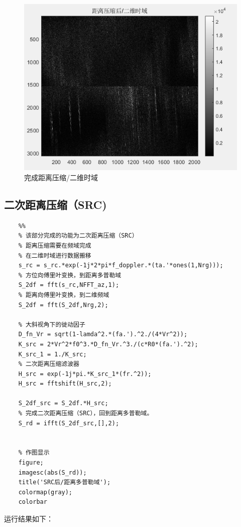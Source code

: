 \documentclass{article}
\begin{document}
\begin{figure}[H] %
	\centering
	\includegraphics[scale=1]{5.png}
	\caption{完成距离压缩/二维时域}
	\label{5}
\end{figure}




\subsection{二次距离压缩（SRC)}
\begin{lstlisting}
	%%
	% 该部分完成的功能为二次距离压缩（SRC）
	% 距离压缩需要在频域完成
	% 在二维时域进行数据搬移
	s_rc = s_rc.*exp(-1j*2*pi*f_doppler.*(ta.'*ones(1,Nrg))); 
	% 方位向傅里叶变换，到距离多普勒域
	S_2df = fft(s_rc,NFFT_az,1);
	% 距离向傅里叶变换，到二维频域
	S_2df = fft(S_2df,Nrg,2);               
	
	% 大斜视角下的徙动因子
	D_fn_Vr = sqrt(1-lamda^2.*(fa.').^2./(4*Vr^2));         
	K_src = 2*Vr^2*f0^3.*D_fn_Vr.^3./(c*R0*(fa.').^2);   
	K_src_1 = 1./K_src;
	% 二次距离压缩滤波器
	H_src = exp(-1j*pi.*K_src_1*(fr.^2)); 
	H_src = fftshift(H_src,2);   
	
	S_2df_src = S_2df.*H_src;  
	% 完成二次距离压缩（SRC），回到距离多普勒域。
	S_rd = ifft(S_2df_src,[],2);  
	
	
	% 作图显示
	figure;
	imagesc(abs(S_rd));
	title('SRC后/距离多普勒域');
	colormap(gray);
	colorbar
\end{lstlisting}
运行结果如下：
\end{document}

